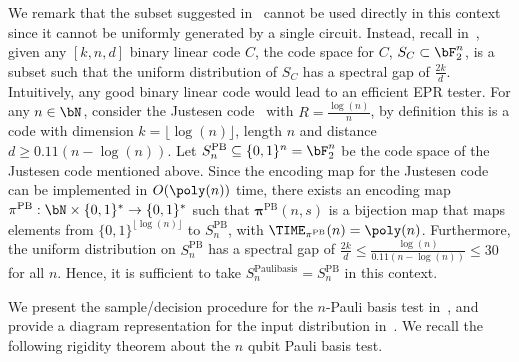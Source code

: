 We remark that the subset suggested in~\cite[Theorem 1.3]{delasalleSpectralGapStability2022} cannot be used directly in this context since it cannot be uniformly generated by a single circuit. Instead, recall in~\cite[Example 1.2]{delasalleSpectralGapStability2022}, given any $[k, n, d]$ binary linear code $C$, the code space for $C$, $S_{C} \subset \bF_{2}^n$, is a subset such that the uniform distribution of $S_C$ has a spectral gap of $\frac{2k}{d}$. Intuitively, any good binary linear code would lead to an efficient EPR tester. For any $n \in \bN$, consider the Justesen code~\cite{justesenClassConstructiveAsymptotically1972} with $R = \frac{\log(n)}{n}$, by definition this is a code with dimension $k = \lfloor \log(n) \rfloor$, length $n$ and distance $d \geq  0.11(n -  \log(n))$. Let $S^{\text{PB}}_n \subseteq\{0,1\}^n = \bF_2^n$ be the code space of the Justesen code mentioned above. Since the encoding map for the Justesen code can be implemented in $O(\poly(n))$ time, there exists an encoding map $\mathbf{\pi}^{\text{PB}}: \bN \times \{0,1\}^* \rightarrow \{0,1\}^*$ such that $\mathbf{\pi}^{\text{PB}} (n, s)$ is a bijection map that maps elements from $\{0,1\}^{\lfloor \log(n) \rfloor}$ to $S^{\text{PB}}_n$, with $\TIME_{\mathbf{\pi}^{\text{PB}}} (n) = \poly(n)$. Furthermore, the uniform distribution on $S^{\text{PB}}_n$ has a spectral gap of $\frac{2k}{d} \leq \frac{\log(n)}{0.11(n -  \log(n))} \leq 30$ for all $n$. Hence, it is sufficient to take $S^{\text{Paulibasis}}_n = S^{\text{PB}}_n$ in this context. 




We present the sample/decision procedure for the $n$-Pauli basis test in~, and provide a diagram representation for the input distribution in~.  We recall the following rigidity theorem about the $n$ qubit Pauli basis test. 




